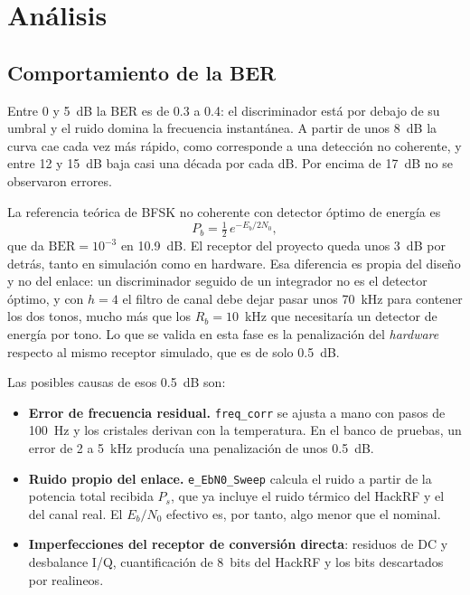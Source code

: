 \documentclass[conference]{IEEEtran}
\begin{document}
\section{Análisis}

\subsection{Comportamiento de la BER}

Entre 0 y 5~dB la BER es de 0.3 a 0.4: el discriminador está por debajo de su umbral y el ruido domina la frecuencia instantánea. A partir de unos 8~dB la curva cae cada vez más rápido, como corresponde a una detección no coherente, y entre 12 y 15~dB baja casi una década por cada dB. Por encima de 17~dB no se observaron errores.

La referencia teórica de BFSK no coherente con detector óptimo de energía es~\cite{proakis}
\begin{equation}
P_b = \tfrac{1}{2}\, e^{-E_b/2N_0},
\end{equation}
que da $\text{BER} = 10^{-3}$ en 10.9~dB. El receptor del proyecto queda unos 3~dB por detrás, tanto en simulación como en hardware. Esa diferencia es propia del diseño y no del enlace: un discriminador seguido de un integrador no es el detector óptimo, y con $h = 4$ el filtro de canal debe dejar pasar unos 70~kHz para contener los dos tonos, mucho más que los $R_b = 10$~kHz que necesitaría un detector de energía por tono. Lo que se valida en esta fase es la penalización del \emph{hardware} respecto al mismo receptor simulado, que es de solo 0.5~dB.

Las posibles causas de esos 0.5~dB son:
\begin{itemize}
\item \textbf{Error de frecuencia residual.} \texttt{freq\_corr} se ajusta a mano con pasos de 100~Hz y los cristales derivan con la temperatura. En el banco de pruebas, un error de 2 a 5~kHz producía una penalización de unos 0.5~dB.
\item \textbf{Ruido propio del enlace.} \texttt{e\_EbN0\_Sweep} calcula el ruido a partir de la potencia total recibida $P_s$, que ya incluye el ruido térmico del HackRF y el del canal real. El $E_b/N_0$ efectivo es, por tanto, algo menor que el nominal.
\item \textbf{Imperfecciones del receptor de conversión directa}: residuos de DC y desbalance I/Q, cuantificación de 8~bits del HackRF y los bits descartados por realineos.
\end{itemize}
\end{document}
